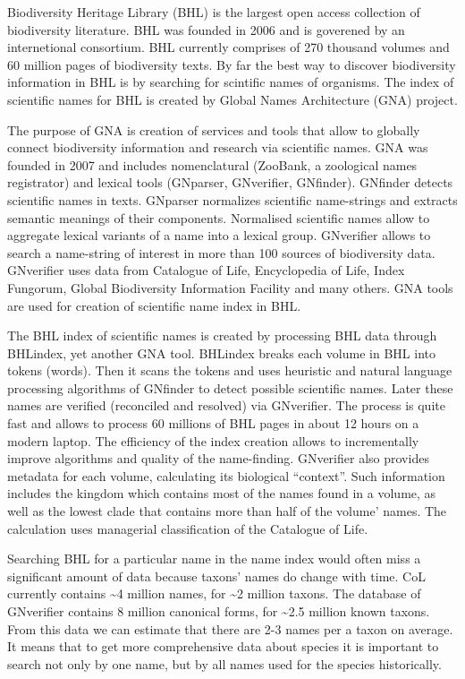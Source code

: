 \documentclass[
]{article}
\begin{document}
Biodiversity Heritage Library (BHL) is the largest open access
collection of biodiversity literature. BHL was founded in 2006 and is
goverened by an internetional consortium. BHL currently comprises of 270
thousand volumes and 60 million pages of biodiversity texts. By far the
best way to discover biodiversity information in BHL is by searching for
scintific names of organisms. The index of scientific names for BHL is
created by Global Names Architecture (GNA) project.

The purpose of GNA is creation of services and tools that allow to
globally connect biodiversity information and research via scientific
names. GNA was founded in 2007 and includes nomenclatural (ZooBank, a
zoological names registrator) and lexical tools (GNparser, GNverifier,
GNfinder). GNfinder detects scientific names in texts. GNparser
normalizes scientific name-strings and extracts semantic meanings of
their components. Normalised scientific names allow to aggregate lexical
variants of a name into a lexical group. GNverifier allows to search a
name-string of interest in more than 100 sources of biodiversity data.
GNverifier uses data from Catalogue of Life, Encyclopedia of Life, Index
Fungorum, Global Biodiversity Information Facility and many others. GNA
tools are used for creation of scientific name index in BHL.

The BHL index of scientific names is created by processing BHL data
through BHLindex, yet another GNA tool. BHLindex breaks each volume in
BHL into tokens (words). Then it scans the tokens and uses heuristic and
natural language processing algorithms of GNfinder to detect possible
scientific names. Later these names are verified (reconciled and
resolved) via GNverifier. The process is quite fast and allows to
process 60 millions of BHL pages in about 12 hours on a modern laptop.
The efficiency of the index creation allows to incrementally improve
algorithms and quality of the name-finding. GNverifier also provides
metadata for each volume, calculating its biological ``context''. Such
information includes the kingdom which contains most of the names found
in a volume, as well as the lowest clade that contains more than half of
the volume' names. The calculation uses managerial classification of the
Catalogue of Life.

Searching BHL for a particular name in the name index would often miss a
significant amount of data because taxons' names do change with time.
CoL currently contains \textasciitilde4 million names, for
\textasciitilde2 million taxons. The database of GNverifier contains 8
million canonical forms, for \textasciitilde2.5 million known taxons.
From this data we can estimate that there are 2-3 names per a taxon on
average. It means that to get more comprehensive data about species it
is important to search not only by one name, but by all names used for
the species historically.
\end{document}
